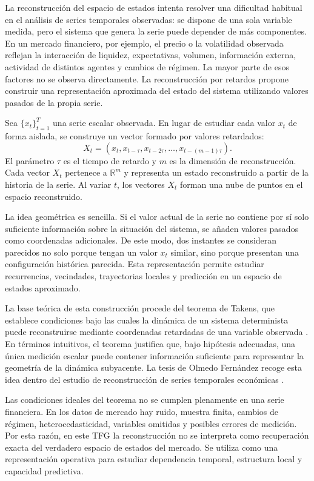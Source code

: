 La reconstrucción del espacio de estados intenta resolver una dificultad habitual en el análisis de series temporales observadas: se dispone de una sola variable medida, pero el sistema que genera la serie puede depender de más componentes. En un mercado financiero, por ejemplo, el precio o la volatilidad observada reflejan la interacción de liquidez, expectativas, volumen, información externa, actividad de distintos agentes y cambios de régimen. La mayor parte de esos factores no se observa directamente. La reconstrucción por retardos propone construir una representación aproximada del estado del sistema utilizando valores pasados de la propia serie.

Sea \(\{x_t\}_{t=1}^{T}\) una serie escalar observada. En lugar de estudiar cada valor \(x_t\) de forma aislada, se construye un vector formado por valores retardados:
\begin{equation}
    X_t=\left(x_t,x_{t-\tau},x_{t-2\tau},\ldots,x_{t-(m-1)\tau}\right).
\end{equation}
El parámetro \(\tau\) es el tiempo de retardo y \(m\) es la dimensión de reconstrucción. Cada vector \(X_t\) pertenece a \(\mathbb{R}^m\) y representa un estado reconstruido a partir de la historia de la serie. Al variar \(t\), los vectores \(X_t\) forman una nube de puntos en el espacio reconstruido.

La idea geométrica es sencilla. Si el valor actual de la serie no contiene por sí solo suficiente información sobre la situación del sistema, se añaden valores pasados como coordenadas adicionales. De este modo, dos instantes se consideran parecidos no solo porque tengan un valor \(x_t\) similar, sino porque presentan una configuración histórica parecida. Esta representación permite estudiar recurrencias, vecindades, trayectorias locales y predicción en un espacio de estados aproximado.

La base teórica de esta construcción procede del teorema de Takens, que establece condiciones bajo las cuales la dinámica de un sistema determinista puede reconstruirse mediante coordenadas retardadas de una variable observada \cite{takens1981}. En términos intuitivos, el teorema justifica que, bajo hipótesis adecuadas, una única medición escalar puede contener información suficiente para representar la geometría de la dinámica subyacente. La tesis de Olmedo Fernández recoge esta idea dentro del estudio de reconstrucción de series temporales económicas \cite{olmedo2001}.

Las condiciones ideales del teorema no se cumplen plenamente en una serie financiera. En los datos de mercado hay ruido, muestra finita, cambios de régimen, heterocedasticidad, variables omitidas y posibles errores de medición. Por esta razón, en este TFG la reconstrucción no se interpreta como recuperación exacta del verdadero espacio de estados del mercado. Se utiliza como una representación operativa para estudiar dependencia temporal, estructura local y capacidad predictiva.

